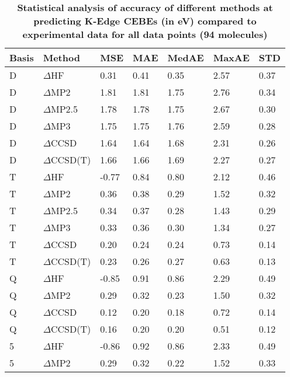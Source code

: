 \begin{table}
  \caption{\textbf{Statistical analysis of accuracy of different methods at predicting K-Edge CEBEs (in eV) compared to experimental data for all data points (94 molecules)}}
  \label{tbl:method-all-summary}
  \begin{tabular}{l l l l l l l }
    \hline
    \textbf{Basis} & \textbf{Method} & \textbf{MSE} & \textbf{MAE} & \textbf{MedAE} & \textbf{MaxAE} & \textbf{STD} \\ 
    \hline
    D & $\Delta$HF & 0.31 & 0.41 & 0.35 & 2.57 & 0.37 \\ 
    D & $\Delta$MP2 & 1.81 & 1.81 & 1.75 & 2.76 & 0.34 \\ 
    D & $\Delta$MP2.5 & 1.78 & 1.78 & 1.75 & 2.67 & 0.30 \\ 
    D & $\Delta$MP3 & 1.75 & 1.75 & 1.76 & 2.59 & 0.28 \\ 
    D & $\Delta$CCSD & 1.64 & 1.64 & 1.68 & 2.31 & 0.26 \\ 
    D & $\Delta$CCSD(T) & 1.66 & 1.66 & 1.69 & 2.27 & 0.27 \\ 
    T & $\Delta$HF & -0.77 & 0.84 & 0.80 & 2.12 & 0.46 \\ 
    T & $\Delta$MP2 & 0.36 & 0.38 & 0.29 & 1.52 & 0.32 \\ 
    T & $\Delta$MP2.5 & 0.34 & 0.37 & 0.28 & 1.43 & 0.29 \\ 
    T & $\Delta$MP3 & 0.33 & 0.36 & 0.30 & 1.34 & 0.27 \\ 
    T & $\Delta$CCSD & 0.20 & 0.24 & 0.24 & 0.73 & 0.14 \\ 
    T & $\Delta$CCSD(T) & 0.23 & 0.26 & 0.27 & 0.63 & 0.13 \\ 
    Q & $\Delta$HF & -0.85 & 0.91 & 0.86 & 2.29 & 0.49 \\ 
    Q & $\Delta$MP2 & 0.29 & 0.32 & 0.23 & 1.50 & 0.32 \\ 
    Q & $\Delta$CCSD & 0.12 & 0.20 & 0.18 & 0.72 & 0.14 \\ 
    Q & $\Delta$CCSD(T) & 0.16 & 0.20 & 0.20 & 0.51 & 0.12 \\ 
    5 & $\Delta$HF & -0.86 & 0.92 & 0.86 & 2.33 & 0.49 \\ 
    5 & $\Delta$MP2 & 0.29 & 0.32 & 0.22 & 1.52 & 0.33 \\ 
    \hline
  \end{tabular}
\end{table}
